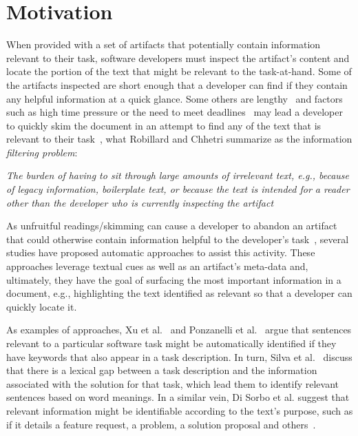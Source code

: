 \section{Motivation}
\label{cp5:motivation}


When provided with a set of artifacts that potentially contain information relevant to their task,
software developers must inspect the artifact's content and locate the portion of the text that might be relevant to the task-at-hand. 
Some of the artifacts inspected are short enough that a developer can find if they contain any helpful information at a quick glance.
Some others are lengthy~\cite{Rastkar2013t} and factors such
as high time pressure or
the need to meet deadlines~\cite{meyer2019}
may lead a developer to quickly skim the document
in an attempt to find any of the text that is relevant to their task~\cite{Starke2009},
what Robillard and Chhetri summarize as the information \textit{filtering problem}:

\smallskip
\begin{bluequote}
    \textit{The burden  of having to sit through large amounts of irrelevant text, e.g., because of legacy information, boilerplate text, or because the text is intended for a reader other than the developer who is currently inspecting the artifact}~\cite{Robillard2015}
\end{bluequote}



As unfruitful readings/skimming can 
cause a developer to abandon an artifact that could otherwise contain information  helpful to the developer's task~\cite{Brandt2009a, Starke2009},
several studies have proposed automatic approaches to assist this activity. 
These approaches leverage textual cues as well as an artifact's meta-data and, ultimately, they have the goal of surfacing 
the most important information in a document, e.g., highlighting the text identified as relevant so that a developer can quickly 
locate it.


As examples of approaches, Xu et al.~\cite{Xu2017} and Ponzanelli et al.~\cite{Ponzanelli2015}
argue that sentences relevant to a particular software task might be automatically identified if they have keywords that also appear in a task description.
In turn, Silva et al.~\cite{silva2019} discuss that 
there is a lexical gap between a task description and the information associated 
with the solution for that task, which lead them to identify
relevant sentences based on word meanings.
In a similar vein, Di Sorbo et al. suggest that relevant information might be identifiable 
according to the text's purpose, such as if it details a feature request, a problem, a solution proposal and others~\cite{Sorbo2015}.


